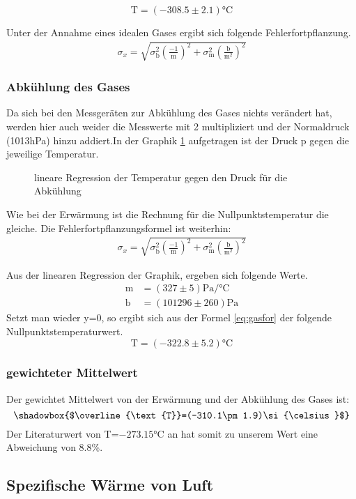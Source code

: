 \documentclass[12pt,a4paper,titlepage,headinclude,bibtotoc]{scrartcl}
\begin{document}
$$\text{T}=(-308.5\pm2.1)\si{\celsius}$$


Unter der Annahme eines idealen Gases ergibt sich folgende Fehlerfortpflanzung.
\begin{align}
	\sigma_{x}=\sqrt{\sigma_\text{b}^2\left(\frac{-1}{\text{m}}\right)^2+\sigma_\text{m}^2\left(\frac{\text{b}}{\text{m}^2}\right)^2}\label{eq:fegas}
\end{align}


\subsubsection{Abkühlung des Gases}
\label{sec:gas2}
Da sich bei den Messgeräten zur Abkühlung des Gases nichts verändert hat, werden hier auch weider die Messwerte mit 2 multipliziert und der Normaldruck (1013hPa) hinzu addiert.In der Graphik \ref{fig:gas2} aufgetragen ist der Druck p gegen die jeweilige Temperatur.
\begin{figure}[!h]
\centering

\caption{lineare Regression der Temperatur gegen den Druck für die Abkühlung}
\label{fig:gas2}
\end{figure}
Wie bei der Erwärmung ist die Rechnung für die Nullpunktstemperatur die gleiche. Die Fehlerfortpflanzungsformel ist weiterhin:
\begin{align}
	\sigma_{x}=\sqrt{\sigma_\text{b}^2\left(\frac{-1}{\text{m}}\right)^2+\sigma_\text{m}^2\left(\frac{\text{b}}{\text{m}^2}\right)^2}\label{eq:fegas}
\end{align}


Aus der linearen Regression der Graphik, ergeben sich folgende Werte.
\begin{align}
	\text{m} &= (327\pm5)\si{\pascal/\celsius}\\
	\text{b} &= (101296\pm260)\si{\pascal}
\end{align}
Setzt man wieder y=0, so ergibt sich aus der Formel \eqref{eq:gasfor} der folgende Nullpunktstemperaturwert.
$$\text{T}=(-322.8\pm5.2)\si{\celsius}$$

\subsubsection{gewichteter Mittelwert}
Der gewichtet Mittelwert von der Erwärmung und der Abkühlung des Gases ist:
$$\shadowbox{$\overline{\text{T}}=(-310.1\pm1.9)\si{\celsius}$}$$
Der  Literaturwert von T=$-273.15\si{\celsius}$ an hat somit zu unserem  Wert eine Abweichung von 8.8\%.

\subsection{Spezifische Wärme von Luft}
\end{document}
